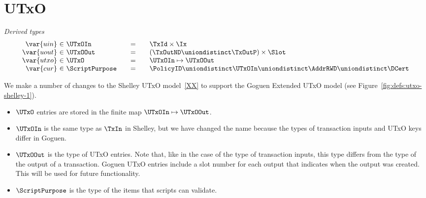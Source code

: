 \section{UTxO}
\label{sec:utxo}


\begin{figure*}[htb]
  \emph{Derived types}
  \begin{equation*}
    \begin{array}{r@{~\in~}l@{\qquad=\qquad}lr}
      \var{uin}
      & \UTxOIn
      & \TxId \times \Ix
      \\
      \var{uout}
      & \UTxOOut
      & (\TxOutND \uniondistinct \TxOutP) \times \Slot
      \\
      \var{utxo}
      & \UTxO
      & \UTxOIn \mapsto \UTxOOut
      \\
      \var{cur}
      & \ScriptPurpose
      & \PolicyID \uniondistinct \UTxOIn \uniondistinct \AddrRWD \uniondistinct \DCert
    \end{array}
  \end{equation*}
  \caption{Definitions used in the UTxO transition system}
  \label{fig:defs:utxo-shelley-1}
\end{figure*}


We make a number of changes to the Shelley UTxO model~\ref{XX} to support the Goguen Extended UTxO model
(see Figure~\ref{fig:defs:utxo-shelley-1}).

\begin{itemize}
\item
  $\UTxO$ entries are stored in the finite map $\UTxOIn\mapsto \UTxOOut$.

\item
  $\UTxOIn$ is the same type as $\TxIn$ in Shelley, but we have changed
  the name because the types of transaction inputs and UTxO keys
  differ in Goguen.

\item
  $\UTxOOut$ is the type of UTxO entries.
  Note that, like in the case of the type of transaction inputs,
  this type differs from the type of the output of a transaction.
  Goguen UTxO entries include a slot number for each output
  that indicates when the output was created.
  This will be used for future functionality.

\item
  $\ScriptPurpose$ is the type of the items that scripts can validate.

\end{itemize}

